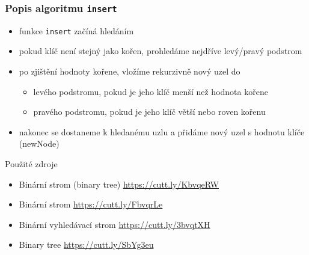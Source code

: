 \documentclass{beamer}
\begin{document}
\begin{frame}
\frametitle{Popis algoritmu \texttt{insert}}
\begin{itemize}
\item funkce \texttt{insert} začíná hledáním
\item pokud klíč není stejný jako kořen, prohledáme nejdříve levý/pravý podstrom
\item po zjištění hodnoty kořene, vložíme rekurzivně nový uzel do
\begin{itemize}
\item levého podstromu, pokud je jeho klíč menší než hodnota kořene
\item pravého podstromu, pokud je jeho klíč větší nebo roven kořenu
\end{itemize}
\item nakonec se dostaneme k hledanému uzlu a přidáme nový uzel s hodnotu klíče (newNode)

\end{itemize}
\end{frame}
\begin{frame}{Použité zdroje}
	\begin{itemize}
		\item Binární strom (binary tree)
		 \url{https://cutt.ly/KbvqeRW}

		\item Binární strom
		 \url{https://cutt.ly/FbvqrLe}

		\item Binární vyhledávací strom
		\url{https://cutt.ly/3bvqtXH}
		
	    \item Binary tree \url{https://cutt.ly/SbYg3eu}

	\end{itemize}
\end{frame}
\end{document}
